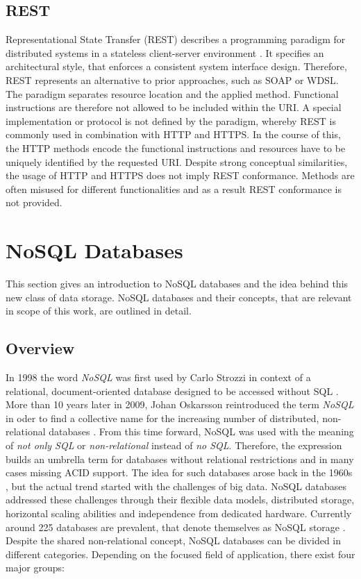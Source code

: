 \subsection{REST}
Representational State Transfer (REST) describes a programming paradigm for distributed systems in a stateless client-server environment \cite{Fielding:2000}. It specifies an architectural style, that enforces a consistent system interface design. Therefore, REST represents an alternative to prior approaches, such as SOAP or WDSL. The paradigm separates resource location and the applied method. Functional instructions are therefore not allowed to be included within the URI. A special implementation or protocol is not defined by the paradigm, whereby REST is commonly used in combination with HTTP and HTTPS. In the course of this, the HTTP methods encode the functional instructions and resources have to be uniquely identified by the requested URI. Despite strong conceptual similarities, the usage of HTTP and HTTPS does not imply REST conformance. Methods are often misused for different functionalities and as a result REST conformance is not provided.

\section{NoSQL Databases}
This section gives an introduction to NoSQL databases and the idea behind this new class of data storage. NoSQL databases and their concepts, that are relevant in scope of this work, are outlined in detail.

\subsection{Overview}
In 1998 the word \textit{NoSQL} was first used by Carlo Strozzi in context of a relational, document-oriented database designed to be accessed without SQL \cite{Strozzi:2007}. More than 10 years later in 2009, Johan Oskarsson reintroduced the term \textit{NoSQL} in oder to find a collective name for the increasing number of distributed, non-relational databases \cite{Oskarsson:2009}. From this time forward, NoSQL was used with the meaning of \textit{not only SQL} or \textit{non-relational} instead of \textit{no SQL}. Therefore, the expression builds an umbrella term for databases without relational restrictions and in many cases missing ACID support. The idea for such databases arose back in the 1960s \cite{IBM:2016, Nelson:1965}, but the actual trend started with the challenges of big data. NoSQL databases addressed these challenges through their flexible data models, distributed storage, horizontal scaling abilities and independence from dedicated hardware. Currently around 225 databases are prevalent, that denote themselves as NoSQL storage \cite{Edlich:2016}. Despite the shared non-relational concept, NoSQL databases can be divided in different categories. Depending on the focused field of application, there exist four major groups:

